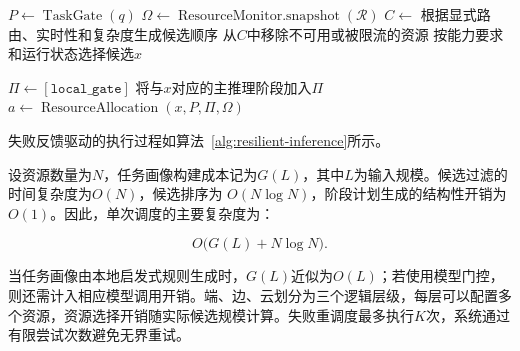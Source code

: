 \begin{algorithm}[t]
    \caption{TIDE-Placement自适应资源调度}
    \label{alg:tide-placement}

    $P \leftarrow \operatorname{TaskGate}(q)$\;
    $\Omega \leftarrow \operatorname{ResourceMonitor.snapshot}(\mathcal{R})$\;
    $C \leftarrow$ 根据显式路由、实时性和复杂度生成候选顺序\;
    从$C$中移除不可用或被限流的资源\;
    按能力要求和运行状态选择候选$x$\;


    $\Pi \leftarrow [\texttt{local\_gate}]$\;
    将与$x$对应的主推理阶段加入$\Pi$\;
    $a \leftarrow \operatorname{ResourceAllocation}(x,P,\Pi,\Omega)$\;
    \;
\end{algorithm}

失败反馈驱动的执行过程如算法~\ref{alg:resilient-inference}所示。

\begin{algorithm}[htbp]
    \caption{失败反馈驱动的有限重调度}
    \label{alg:resilient-inference}

    \;
\end{algorithm}

设资源数量为\(N\)，任务画像构建成本记为\(G(L)\)，其中\(L\)为输入规模。候选过滤的时间复杂度为\(O(N)\)，候选排序为
\(O(N\log N)\)，阶段计划生成的结构性开销为\(O(1)\)。因此，单次调度的主要复杂度为：

\[
O\bigl(G(L)+N\log N\bigr).
\]

当任务画像由本地启发式规则生成时，\(G(L)\)近似为\(O(L)\)；若使用模型门控，则还需计入相应模型调用开销。端、边、云划分为三个逻辑层级，每层可以配置多个资源，资源选择开销随实际候选规模计算。失败重调度最多执行\(K\)次，系统通过有限尝试次数避免无界重试。

